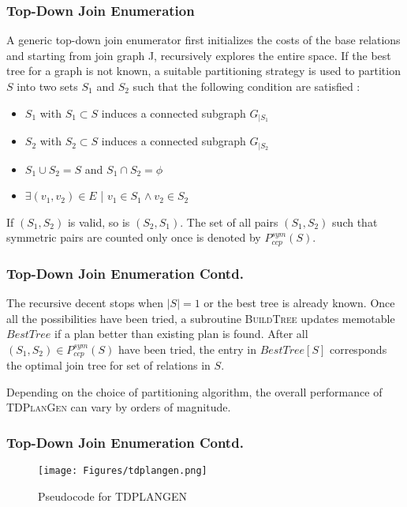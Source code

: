 \documentclass{beamer}
\begin{document}
\begin{frame}
\frametitle{Top-Down Join Enumeration}
A generic top-down join enumerator first initializes the costs of the base relations and starting from join graph J, recursively explores the entire space. If the best tree for a graph is not known, a suitable partitioning strategy is used to partition $S$ into two sets $S_{1}$ and $S_{2}$ such that the following condition are satisfied :
\begin{itemize}
	\item $S_{1}$ with $S_{1} \subset S$ induces a connected subgraph $G_{|S_{1}}$
	\item $S_{2}$ with $S_{2} \subset S$ induces a connected subgraph $G_{|S_{2}}$
	\item $S_{1} \cup S_{2} = S$ and $S_{1} \cap S_{2} = \phi$
	\item $\exists (v_{1}, v_{2}) \in E$ | $v_{1} \in S_{1} \wedge v_{2} \in S_{2}$
\end{itemize}
If $(S_{1},S_{2})$ is valid, so is $(S_{2},S_{1})$. The set of all pairs $(S_{1},S_{2})$ such that symmetric pairs are counted only once is denoted by $P^{sym}_{ccp}(S)$.
\end{frame}

\begin{frame}
\frametitle{Top-Down Join Enumeration Contd.}
The recursive decent stops when $|S| = 1$ or the best tree is already known. Once all the possibilities have been tried, a subroutine \textsc{BuildTree} updates memotable $BestTree$ if a plan better than existing plan is found. After all $(S_{1}, S_{2}) \in P^{sym}_{ccp}(S)$ have been tried, the entry in $BestTree[S]$ corresponds the optimal join tree for set of relations in $S$.\vspace{\baselineskip}

Depending on the choice of partitioning algorithm, the overall performance of \textsc{TDPlanGen} can vary by orders of magnitude.
\end{frame}

\begin{frame}
\frametitle{Top-Down Join Enumeration Contd.}
\begin{figure}[here]
\begin{center}
\texttt{[image: Figures/tdplangen.png]}
\end{center}
\caption{Pseudocode for TDPLANGEN}
\label{fig:tdplangen}
\end{figure}
\end{frame}
\end{document}
